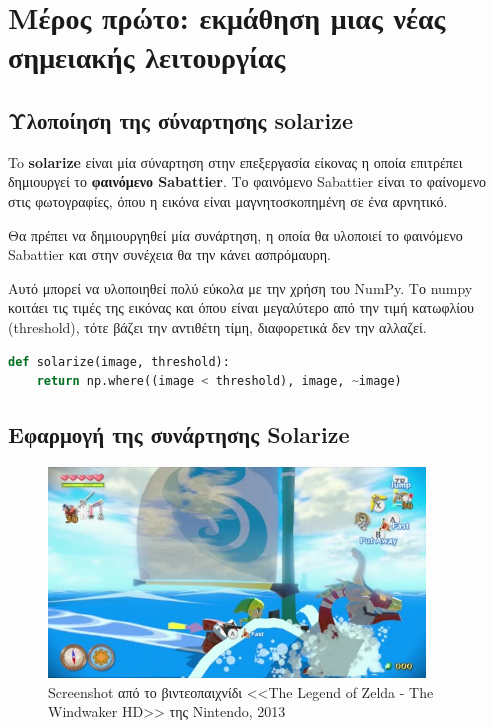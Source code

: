 \label{Chapter1}

\section{Μέρος πρώτο: εκμάθηση μιας νέας σημειακής λειτουργίας}

\subsection{Υλοποίηση της σύναρτησης solarize}

To \textbf{solarize} είναι μία σύναρτηση στην επεξεργασία είκονας η οποία επιτρέπει δημιουργεί το \textbf{φαινόμενο Sabattier}.
Το φαινόμενο Sabattier είναι το φαίνομενο στις φωτογραφίες, όπου η εικόνα είναι μαγνητοσκοπημένη σε ένα αρνητικό.

\begin{problem}
	Θα πρέπει να δημιουργηθεί μία συνάρτηση, η οποία θα υλοποιεί το φαινόμενο Sabattier και στην συνέχεια θα την κάνει ασπρόμαυρη.
\end{problem}

Αυτό μπορεί να υλοποιηθεί πολύ εύκολα με την χρήση του NumPy.
Το numpy κοιτάει τις τιμές της εικόνας και όπου είναι μεγαλύτερο από την τιμή κατωφλίου (threshold), τότε βάζει την αντιθέτη τίμη, διαφορετικά δεν την αλλαζεί.

\begin{lstlisting}[language=Python, caption=Solarize Function]
def solarize(image, threshold):
    return np.where((image < threshold), image, ~image)
\end{lstlisting}

\subsection{Εφαρμογή της συνάρτησης Solarize}

\begin{figure}[th]
	\centering
	\includegraphics[width=100mm]{Figures/zelda}
	\caption[The Legend of Zelda - The Windwaker HD]{Screenshot από το βιντεοπαιχνίδι <<The Legend of Zelda - The Windwaker HD>> της Nintendo, 2013}
	\label{fig:zelda}
\end{figure}

